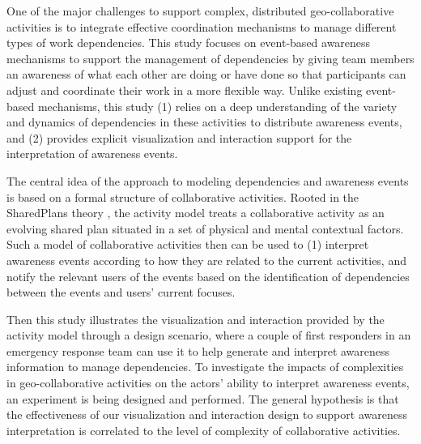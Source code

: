 One of the major challenges to support complex, distributed geo-collaborative activities is to integrate effective coordination mechanisms to manage different types of work dependencies. This study focuses on event-based awareness mechanisms to support the management of dependencies by giving team members an awareness of what each other are doing or have done so that participants can adjust and coordinate their work in a more flexible way. Unlike existing event-based mechanisms, this study (1) relies on a deep understanding of the variety and dynamics of dependencies in these activities to distribute awareness events, and (2) provides explicit visualization and interaction support for the interpretation of awareness events.  

The central idea of the approach to modeling dependencies and awareness events is based on a formal structure of collaborative activities. Rooted in the SharedPlans theory \cite{grosz1996collaborative,Grosz98theevolution}, the activity model treats a collaborative activity as an evolving shared plan situated in a set of physical and mental contextual factors. Such a model of collaborative activities then can be used to (1) interpret awareness events according to how they are related to the current activities, and notify the relevant users of the events based on the identification of dependencies between the events and users' current focuses. 

Then this study illustrates the visualization and interaction provided by the activity model through a design scenario, where a couple of first responders in an emergency response team can use it to help generate and interpret awareness information to manage dependencies. To investigate the impacts of complexities in geo-collaborative activities on the actors' ability to interpret awareness events, an experiment is being designed and performed. The general hypothesis is that the effectiveness of our visualization and interaction design to support awareness interpretation is correlated to the level of complexity of collaborative activities.
